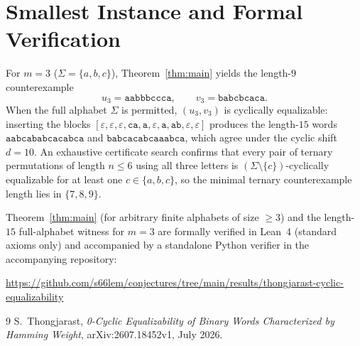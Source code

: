\documentclass[11pt]{article}
\begin{document}
\section{Smallest Instance and Formal Verification}

For $m = 3$ ($\Sigma = \{a, b, c\}$), Theorem~\ref{thm:main} yields the
length-$9$ counterexample
\[
u_3 = \texttt{aabbbccca}, \qquad v_3 = \texttt{babcbcaca}.
\]
When the full alphabet $\Sigma$ is permitted, $(u_3, v_3)$ is cyclically
equalizable: inserting the blocks
$[\varepsilon, \varepsilon, \varepsilon, \texttt{ca}, \texttt{a}, \varepsilon,
\texttt{a}, \texttt{ab}, \varepsilon, \varepsilon]$
produces the length-$15$ words $\texttt{aabcababcacabca}$ and
$\texttt{babcacabcaaabca}$, which agree under the cyclic shift $d = 10$.
An exhaustive certificate search confirms that every pair of ternary
permutations of length $n \le 6$ using all three letters is
$(\Sigma \setminus \{c\})$-cyclically equalizable for at least one
$c \in \{a, b, c\}$, so the minimal ternary counterexample length lies in
$\{7, 8, 9\}$.

Theorem~\ref{thm:main} (for arbitrary finite alphabets of size $\ge 3$) and the
length-$15$ full-alphabet witness for $m = 3$ are formally verified in Lean~4
(standard axioms only) and accompanied by a standalone Python verifier in the
accompanying repository:
\begin{center}
\url{https://github.com/s66lem/conjectures/tree/main/results/thongjarast-cyclic-equalizability}
\end{center}

\begin{thebibliography}{9}
S.~Thongjarast,
\emph{0-Cyclic Equalizability of Binary Words Characterized by Hamming Weight},
arXiv:2607.18452v1, July 2026.
\end{thebibliography}
\end{document}
